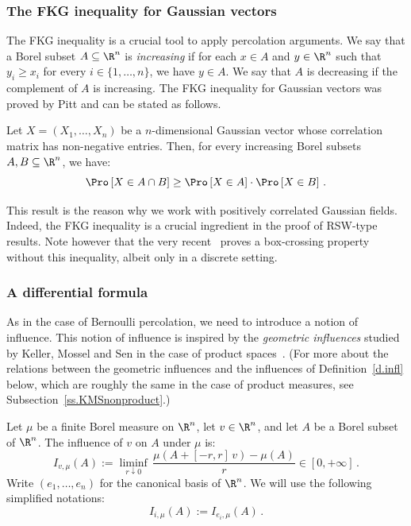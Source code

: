 \subsubsection{The FKG inequality for Gaussian vectors}

The FKG inequality is a crucial tool to apply percolation arguments. We say that a Borel subset $A\subseteq\R^n$ is \emph{increasing} if for each $x \in A$ and $y\in\R^n$ such that $y_i \geq x_i$ for every $i \in \lbrace 1,\dots, n \rbrace$, we have $y \in A$. We say that $A$ is decreasing if the complement of $A$ is increasing. The FKG inequality for Gaussian vectors was proved by Pitt and can be stated as follows.

\begin{theo}\label{t.FKG}
Let $X = (X_1,\dots, X_n)$ be a $n$-dimensional Gaussian vector whose correlation matrix has non-negative entries. Then, for every increasing Borel subsets $A,B \subseteq \R^n$, we have:
\[
\Pro \left[X \in A \cap B \right] \geq \Pro \left[X \in A \right] \cdot \Pro \left[X \in B \right] \,.
\]
\end{theo}

This result is the reason why we work with positively correlated Gaussian fields. Indeed, the FKG inequality is a crucial ingredient in the proof of RSW-type results. Note however that the very recent~\cite{bg_17} proves a box-crossing property without this inequality, albeit only in a discrete setting.

\subsubsection{A differential formula}\label{sss.russo}

As in the case of Bernoulli percolation, we need to introduce a notion of influence. This notion of influence is inspired by the \emph{geometric influences} studied by Keller, Mossel and Sen in the case of product spaces~\cite{keller2012geometric,keller2014geometric}. (For more about the relations between the geometric influences and the influences of Definition~\ref{d.infl} below, which are roughly the same in the case of product measures, see Subsection~\ref{ss.KMSnonproduct}.)

\begin{defi}\label{d.infl}
Let $\mu$ be a finite Borel measure on $\R^n$, let $v \in \R^n$, and let $A$ be a Borel subset of $\R^n$. The influence of $v$ on $A$ under $\mu$ is:
\[
I_{v,\mu}(A) := \underset{r \downarrow 0}{\liminf} \, \frac{\mu \left(A + [-r,r] \, v \right) - \mu \left(A \right)}{r} \in [0,+\infty] \,.
\]
Write $\left(e_1,\dots, e_n \right)$ for the canonical basis of $\R^n$. We will use the following simplified notations:
\[
I_{i,\mu}(A) := I_{e_i,\mu}(A) \,.
\]
\end{defi}
